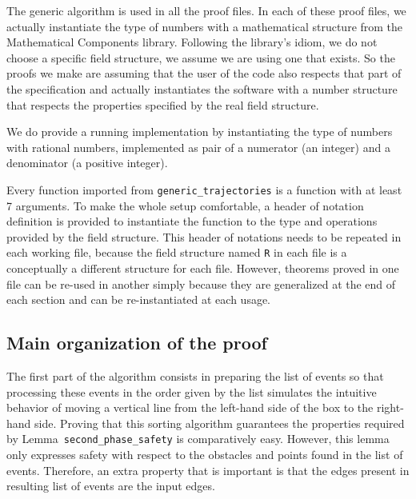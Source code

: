 \documentclass[a4paper, USenglish, cleveref, autoref, thm-restate]{lipics-v2021}
\begin{document}
The generic algorithm is used in all the proof files.  In each of
these proof files, we actually instantiate the type of numbers with
a mathematical structure from the {\sc Mathematical Components} library.
Following the library's idiom, we do not choose a specific field structure,
we assume we are using one that exists.  So the proofs we make are assuming
that the user of the code also respects that part of the specification and
actually instantiates the software with a number structure that respects the
properties specified by the real field structure.

We do provide a running implementation by instantiating the
type of numbers with rational numbers, implemented as pair of a numerator
(an integer) and a denominator (a positive integer).

Every function imported from {\tt generic\_trajectories} is a function
with at least 7 arguments.  To make the whole setup comfortable, a
header of notation definition is provided to instantiate the function
to the type and operations provided by the field structure.  This header of
notations needs to be repeated in each working file, because the field
structure named {\tt R} in each file is a conceptually a different structure
for each file.   However, theorems proved in one file can be re-used in another
simply because they are generalized at the end of each section and can be
re-instantiated at each usage.

\subsection{Main organization of the proof}
The first part of the algorithm consists in preparing the list of
events so that processing these events in the order given by the list
simulates the intuitive behavior of moving a vertical line
from the left-hand side of the box to the right-hand
side.  Proving that this sorting algorithm guarantees the properties
required by Lemma~{\tt second\_phase\_safety} is comparatively easy.
However, this lemma only expresses safety with respect to the obstacles and
points found in the list of events.  Therefore, an extra property that is
important is that the edges present in resulting
list of events are the input edges.
\end{document}
